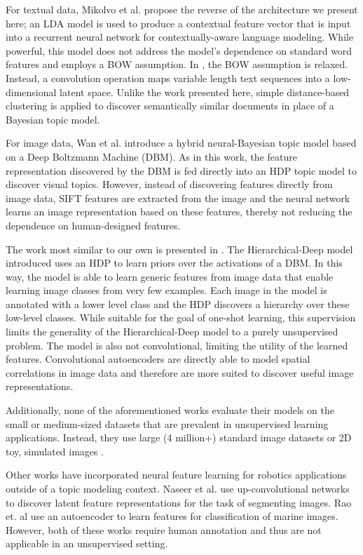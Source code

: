\documentclass[letterpaper, 10 pt, conference]{ieeeconf}
\begin{document}
For textual data, Mikolvo et al. \cite{Mikolov2012} propose the reverse of the architecture we present here; an LDA model is used to produce a contextual feature vector that is input into a recurrent neural network for contextually-aware language modeling. While powerful, this model does not address the model's dependence on standard word features and employs a BOW assumption. In \cite{Shen2014}, the BOW assumption is relaxed. Instead, a convolution operation maps variable length text sequences into a low-dimensional latent space. Unlike the work presented here, simple distance-based clustering is applied to discover semantically similar documents in place of a Bayesian topic model.
     
For image data, Wan et al. \cite{Wan} introduce a hybrid neural-Bayesian topic model based on a Deep Boltzmann Machine (DBM). As in this work, the feature representation discovered by the DBM is fed directly into an HDP topic model to discover visual topics.  However, instead of discovering features directly from image data, SIFT features are extracted from the image and  the neural network learns an image representation based on these features, thereby not reducing the dependence on human-designed features. 

The work most similar to our own is presented in \cite{Salakhutdinov}.  The Hierarchical-Deep model introduced uses an HDP to learn priors over the activations of a DBM. In this way, the model is able to learn generic features from image data that enable learning image classes from very few examples. Each image in the model is annotated with a lower level class and the HDP discovers a hierarchy over these low-level classes. While suitable for the goal of one-shot learning, this supervision limits the generality of the Hierarchical-Deep model to a purely unsupervised problem. The model is also not convolutional, limiting the utility of the learned features. Convolutional autoencoders are directly able to model spatial correlations in image data and therefore are more suited to discover useful image representations.

Additionally, none of the aforementioned works evaluate their models on the small or medium-sized datasets that are prevalent in unsupervised learning applications. Instead, they use large (4 million+) standard image datasets \cite{Salakhutdinov} or 2D toy, simulated images \cite{Wan}. 

Other works have incorporated neural feature learning for robotics applications outside of a topic modeling context. Naseer et al. \cite{Naseer} use up-convolutional networks to discover latent feature representations for the task of segmenting images. Rao et. al \cite{Rao2014} use an autoencoder to learn features for classification of marine images. However, both of these works require human annotation and thus are not applicable in an unsupervised setting. 
\end{document}
